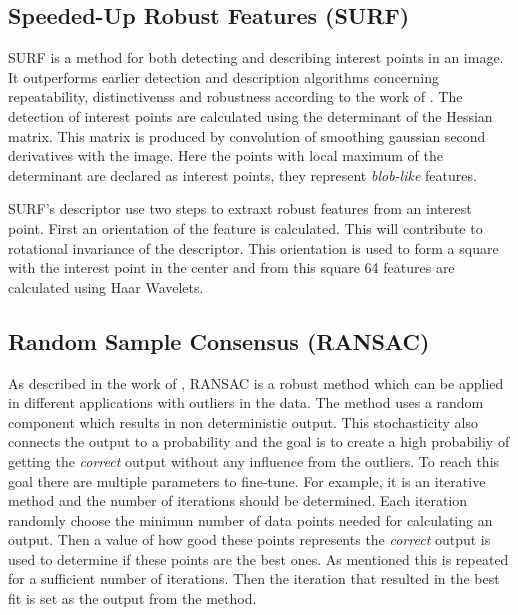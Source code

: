 \subsection{Speeded-Up Robust Features (SURF)}
SURF is a method for both detecting and describing interest points in an image.
It outperforms earlier detection and description algorithms concerning repeatability, distinctivenss and robustness according to the work of \cite{SURF}.
The detection of interest points are calculated using the determinant of the Hessian matrix.
This matrix is produced by convolution of smoothing gaussian second derivatives with the image.
Here the points with local maximum of the determinant are declared as interest points, they represent {\it blob-like} features.

SURF's descriptor use two steps to extraxt robust features from an interest point.
First an orientation of the feature is calculated.
This will contribute to rotational invariance of the descriptor.
This orientation is used to form a square with the interest point in the center and from this square 64 features are calculated using Haar Wavelets.

\subsection{Random Sample Consensus (RANSAC)}
As described in the work of \cite{RANSAC}, RANSAC is a robust method which can be applied in different applications with outliers in the data.
The method uses a random component which results in non deterministic output.
This stochasticity also connects the output to a probability and the goal is to create a high probabiliy of getting the {\it correct} output without any influence from the outliers.
To reach this goal there are multiple parameters to fine-tune.
For example, it is an iterative method and the number of iterations should be determined.
Each iteration randomly choose the minimun number of data points needed for calculating an output.
Then a value of how good these points represents the {\it correct} output is used to determine if these points are the best ones.
As mentioned this is repeated for a sufficient number of iterations.
Then the iteration that resulted in the best fit is set as the output from the method.
